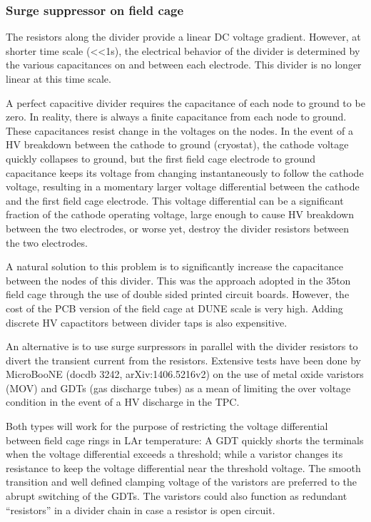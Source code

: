 \subsubsection{Surge suppressor on field cage}

The resistors along the divider provide a linear DC voltage gradient. However, at shorter time scale (<<1s), the electrical behavior of the divider is determined by the various capacitances on and between each electrode.  This divider is no longer linear at this time scale. 

A perfect capacitive divider requires the capacitance of each node to ground to be zero.  In reality, there is always a finite capacitance from each node to ground.  These capacitances resist change in the voltages on the nodes. In the event of a HV breakdown between the cathode to ground (cryostat), the cathode voltage quickly collapses to ground, but the first field cage electrode to ground capacitance keeps its voltage from changing instantaneously to follow the cathode voltage, resulting in a momentary larger voltage differential between the cathode and the first field cage electrode. This voltage differential can be a significant fraction of the cathode operating voltage, large enough to cause HV breakdown between the two electrodes, or worse yet, destroy the divider resistors between the two electrodes.

A natural solution to this problem is to significantly increase the capacitance between the nodes of this divider. This was the approach adopted in the 35ton field cage through the use of double sided printed circuit boards.  However, the cost of the PCB version of the field cage at DUNE scale is very high. Adding discrete HV capactitors between divider taps is also expensitive.

An alternative is to use surge surpressors in parallel with the divider resistors to divert the transient current from the resistors. Extensive tests have been done by MicroBooNE (docdb 3242, arXiv:1406.5216v2) on the use of metal oxide varistors (MOV) and GDTs (gas discharge tubes) as a mean of limiting the over voltage condition in the event of a HV discharge in the TPC.

Both types will work for the purpose of restricting the voltage differential between field cage rings in LAr temperature: 
A GDT quickly shorts the terminals when the voltage differential exceeds a threshold; while
a varistor changes its resistance to keep the voltage differential near the threshold voltage.
The smooth transition and well defined clamping voltage of the varistors are preferred to the abrupt switching of the GDTs.
The varistors could also function as redundant ``resistors'' in a divider chain in case a resistor is open circuit.

